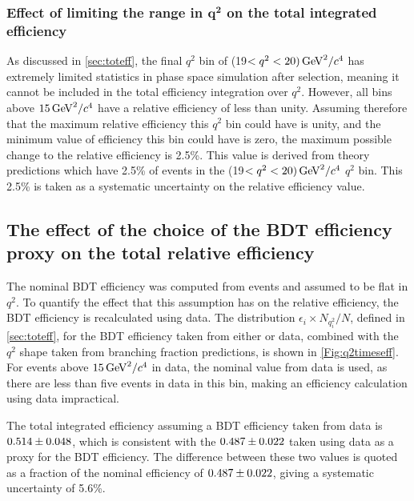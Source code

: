 \subsubsection[Effect of limiting the range in $q^{2}$ on the total integrated efficiency]{Effect of limiting the range in $\mathbold{q^{2}}$ on the total integrated efficiency}
\label{sec:limit}
As discussed in \autoref{sec:toteff}, the final $q^{2}$ bin of (19$<q^{2}<20) \mathrm{\,Ge\kern -0.1em V}^{2}/c^{4}$ has extremely limited statistics in phase space simulation after selection, meaning it cannot be included in the total efficiency integration over $q^{2}$. However, all bins above $15 \mathrm{\,Ge\kern -0.1em V}^{2}/c^{4}$ have a relative efficiency of less than unity. Assuming therefore that the maximum relative efficiency this $q^{2}$ bin could have is unity, and the minimum value of efficiency this bin could have is zero, the maximum possible change to the relative efficiency is 2.5\%.  This value is derived from \LbL theory predictions which have 2.5\% of events in the (19$<q^{2}<20) \mathrm{\,Ge\kern -0.1em V}^{2}/c^{4}$ $q^{2}$ bin. This 2.5\% is taken as a systematic uncertainty on the relative efficiency value.




\subsection{The effect of the choice of the BDT efficiency proxy on the total relative efficiency}
The nominal BDT efficiency was computed from \LbKjpsi events and assumed to be flat in $q^{2}$. To quantify the effect that this assumption has on the relative efficiency, the BDT efficiency is recalculated using \LbK data.  The distribution $\epsilon_{i}\times N_{q^{2}_{i}}/N$, defined in \autoref{sec:toteff}, for the BDT efficiency taken from either \LbKjpsi or \LbK data, combined with the $q^{2}$ shape taken from \LbL branching fraction predictions, is shown in \autoref{Fig:q2timeseff}. For events above $15\mathrm{\,Ge\kern -0.1em V}^{2}/c^{4}$ in \LbK data, the nominal value from \LbKjpsi data is used, as there are less than five events in \LbK data in this bin, making an efficiency calculation using \LbK data impractical.

The total integrated efficiency assuming a BDT efficiency taken from \LbK data is $0.514\pm0.048$, which is consistent with the $0.487\pm0.022$ taken using \LbKjpsi data as a proxy for the BDT efficiency. The difference between these two values is quoted as a fraction of the nominal efficiency of $0.487\pm0.022$, giving a systematic uncertainty of 5.6\%.

